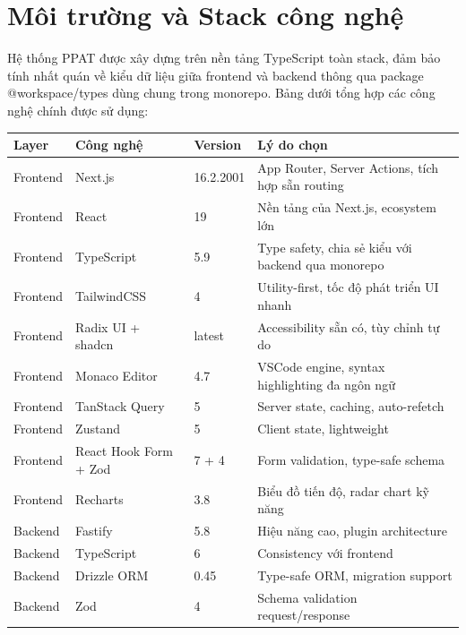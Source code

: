 \documentclass[../main.tex]{subfiles}
\begin{document}
\section{Môi trường và Stack công nghệ}

Hệ thống PPAT được xây dựng trên nền tảng TypeScript toàn stack, đảm bảo tính nhất quán về kiểu dữ liệu giữa frontend và backend thông qua package @workspace/types dùng chung trong monorepo. Bảng dưới tổng hợp các công nghệ chính được sử dụng:


{
\renewcommand{\arraystretch}{1.5}
\begin{tabularx}{\textwidth}{|p{2.0cm}|p{4cm}|p{2.0cm}|>{\raggedright\arraybackslash}X|}
\caption{Bảng tổng hợp công nghệ của thống}
\label{tab:bang-tong-hop-cong-nghe-cua-thong}
\\
\hline
\textbf{Layer} & \textbf{Công nghệ} & \textbf{Version} & \textbf{Lý do chọn} \\
\hline
Frontend & Next.js & 16.2.2001 & App Router, Server Actions, tích hợp sẵn routing \\
\hline
Frontend & React & 19 & Nền tảng của Next.js, ecosystem lớn \\
\hline
Frontend & TypeScript & 5.9 & Type safety, chia sẻ kiểu với backend qua monorepo \\
\hline
Frontend & TailwindCSS & 4 & Utility-first, tốc độ phát triển UI nhanh \\
\hline
Frontend & Radix UI + shadcn & latest & Accessibility sẵn có, tùy chỉnh tự do \\
\hline
Frontend & Monaco Editor & 4.7 & VSCode engine, syntax highlighting đa ngôn ngữ \\
\hline
Frontend & TanStack Query & 5 & Server state, caching, auto-refetch \\
\hline
Frontend & Zustand & 5 & Client state, lightweight \\
\hline
Frontend & React Hook Form + Zod & 7 + 4 & Form validation, type-safe schema \\
\hline
Frontend & Recharts & 3.8 & Biểu đồ tiến độ, radar chart kỹ năng \\
\hline
Backend & Fastify & 5.8 & Hiệu năng cao, plugin architecture \\
\hline
Backend & TypeScript & 6 & Consistency với frontend \\
\hline
Backend & Drizzle ORM & 0.45 & Type-safe ORM, migration support \\
\hline
Backend & Zod & 4 & Schema validation request/response \\
\hline

\end{tabularx}}
\end{document}
